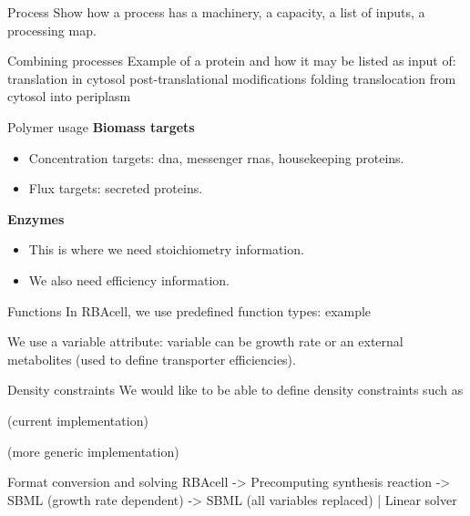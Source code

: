\documentclass{beamer}
\begin{document}
\begin{frame}{Process}
  Show how a process has a machinery, a capacity, a list of inputs,
  a processing map.
\end{frame}

\begin{frame}{Combining processes}
  Example of a protein and how it may be listed as input of:
  translation in cytosol
  post-translational modifications
  folding
  translocation from cytosol into periplasm
\end{frame}

\begin{frame}{Polymer usage}
  \textbf{Biomass targets}
  \begin{itemize}
    \item Concentration targets: dna, messenger rnas, housekeeping proteins.
    \item Flux targets: secreted proteins.
  \end{itemize}
  \textbf{Enzymes}
  \begin{itemize}
    \item This is where we need stoichiometry information.
    \item We also need efficiency information.
  \end{itemize}
\end{frame}

\begin{frame}{Functions}
  In RBAcell, we use predefined function types:
  example

  We use a variable attribute: variable can be growth rate or an external
  metabolites (used to define transporter efficiencies).
\end{frame}

\begin{frame}{Density constraints}
  We would like to be able to define density constraints such as

  (current implementation)

  (more generic implementation)
\end{frame}

\begin{frame}{Format conversion and solving}
  RBAcell -> Precomputing synthesis reaction -> SBML (growth rate dependent)
                                             -> SBML (all variables replaced)
                          |
                    Linear solver
\end{frame}
\end{document}

